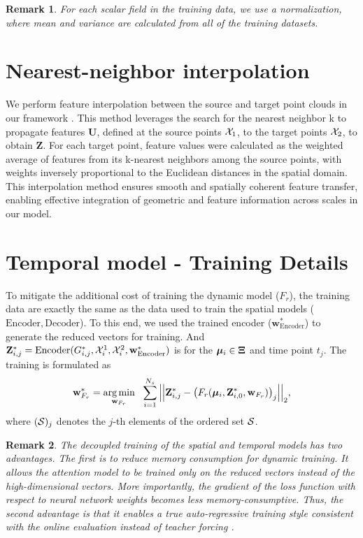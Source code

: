 \documentclass{article}
\newtheorem{remark}{Remark}
\begin{document}
\begin{remark}
For each scalar field in the training data, we use a normalization, where mean and variance are calculated from all of the training datasets. 
\end{remark}

\section{Nearest-neighbor interpolation}
\label{sec:in}
{We perform feature interpolation between the source and target point clouds in our framework \cite{you2024gnumap}. This method leverages the search for the nearest neighbor k to propagate features $\mathbf{U}$, defined at the source points $\mathcal{X}_1$, to the target points $\mathcal{X}_2$, to obtain $\mathbf{Z}$. For each target point, feature values were calculated as the weighted average of features from its k-nearest neighbors among the source points, with weights inversely proportional to the Euclidean distances in the spatial domain. This interpolation method ensures smooth and spatially coherent feature transfer, enabling effective integration of geometric and feature information across scales in our model.}


\section{Temporal model - Training Details}
\label{sec:temp_model_train}
To mitigate the additional cost of training the dynamic model ($F_r$), the training data are exactly the same as the data used to train the spatial models ($\mathrm{Encoder},\mathrm{Decoder}$). To this end, we used the trained encoder ($\mathbf{w}^*_\mathrm{Encoder}$) to generate the reduced vectors for training. And $\mathbf{Z}^*_{i,j}=\mathrm{Encoder}(G^*_{i,j},\mathcal{X}^1_i,\mathcal{X}^2_i,\mathbf{w}^*_{\mathrm{Encoder}})$ is for the ${\boldsymbol{\mu}}_i\in\mathbf{\Xi}$ and time point $t_j$. The training is formulated as 
\begin{equation}
        \mathbf{w}^*_{F_r}=\underset{\mathbf{w}_{F_r}}{\arg\min} ~~ \sum_{i=1}^{N_s}\Big|\Big|\mathbf{Z}^*_{i,j} - \big(F_r({\boldsymbol{\mu}}_i,\mathbf{Z}^*_{i,0},\mathbf{w}_{F_r})\big)_j\Big|\Big|_2
       ,
\end{equation}
where $(\mathcal{S})_j$ denotes the $j$-th elements of the ordered set $\mathcal{S}$.
\begin{remark}
The decoupled training of the spatial and temporal models has two advantages. The first is to reduce memory consumption for dynamic training. It allows the attention model to be trained only on the reduced vectors instead of the high-dimensional vectors. More importantly, the gradient of the loss function with respect to neural network weights becomes less memory-consumptive. Thus, the second advantage is that it enables a true auto-regressive training style consistent with the online evaluation instead of teacher forcing \cite{pfaff2020learning,xu2021conditionally}. 
\end{remark}
    
\end{document}
